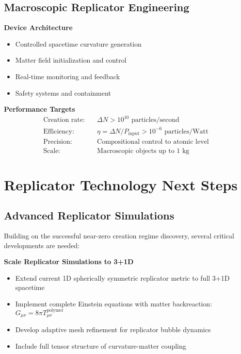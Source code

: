\documentclass[11pt]{article}
\begin{document}
\subsection{Macroscopic Replicator Engineering}

\textbf{Device Architecture}
\begin{itemize}
\item Controlled spacetime curvature generation
\item Matter field initialization and control
\item Real-time monitoring and feedback
\item Safety systems and containment
\end{itemize}

\textbf{Performance Targets}
\begin{align}
\text{Creation rate:} &\quad \Delta N > 10^{10} \text{ particles/second} \\
\text{Efficiency:} &\quad \eta = \Delta N / P_{\text{input}} > 10^{-6} \text{ particles/Watt} \\
\text{Precision:} &\quad \text{Compositional control to atomic level} \\
\text{Scale:} &\quad \text{Macroscopic objects up to 1 kg}
\end{align}

\section{Replicator Technology Next Steps}

\subsection{Advanced Replicator Simulations}

Building on the successful near-zero creation regime discovery, several critical developments are needed:

\textbf{Scale Replicator Simulations to 3+1D}
\begin{itemize}
\item Extend current 1D spherically symmetric replicator metric to full 3+1D spacetime
\item Implement complete Einstein equations with matter backreaction: $G_{\mu\nu} = 8\pi T_{\mu\nu}^{\text{polymer}}$
\item Develop adaptive mesh refinement for replicator bubble dynamics
\item Include full tensor structure of curvature-matter coupling
\end{itemize}
\end{document}
